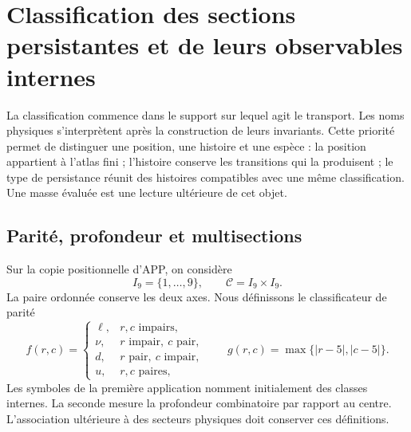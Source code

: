 \section{Classification des sections persistantes et de leurs observables internes}
\label{vi:vi:sec:atlas}

La classification commence dans le support sur lequel agit le transport.
Les noms physiques s’interprètent après la construction de leurs invariants.
Cette priorité permet de distinguer une position, une histoire et une espèce :
la position appartient à l’atlas fini ; l’histoire conserve les transitions
qui la produisent ; le type de persistance réunit des histoires compatibles avec une
même classification. Une masse évaluée est une lecture ultérieure de cet objet.

\subsection{Parité, profondeur et multisections}

Sur la copie positionnelle d’APP, on considère
\[
 I_9=\{1,\ldots,9\},\qquad \mathcal C=I_9\times I_9.
\]
La paire ordonnée conserve les deux axes. Nous définissons le classificateur de parité
\[
 f(r,c)=
 \begin{cases}
 \ell,&r,c\text{ impairs},\\
 \nu,&r\text{ impair},\ c\text{ pair},\\
 d,&r\text{ pair},\ c\text{ impair},\\
 u,&r,c\text{ paires},
 \end{cases}
 \qquad g(r,c)=\max\{|r-5|,|c-5|\}.
\]
Les symboles de la première application nomment initialement des classes internes.
La seconde mesure la profondeur combinatoire par rapport au centre. L’association
ultérieure à des secteurs physiques doit conserver ces définitions.


